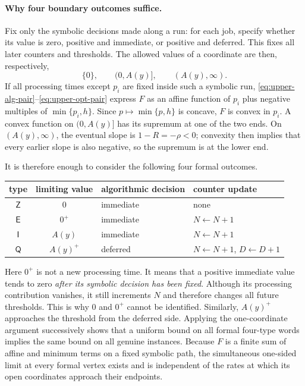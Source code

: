 \paragraph{Why four boundary outcomes suffice.}
Fix only the symbolic decisions made along a run: for each job, specify
whether its value is zero, positive and immediate, or positive and deferred.
This fixes all later counters and thresholds.  The allowed values of a
coordinate are then, respectively,
\[
 \{0\},\qquad (0,A(y)],\qquad (A(y),\infty).
\]
If all processing times except $p_i$ are fixed inside such a symbolic run,
\eqref{eq:upper-alg-pair}--\eqref{eq:upper-opt-pair} express $F$ as an
affine function of $p_i$ plus negative multiples of
$\min\{p_i,h\}$.  Since $p\mapsto\min\{p,h\}$ is concave, $F$ is convex in
$p_i$.  A convex function on $(0,A(y)]$ has its supremum at one of the two
ends.  On $(A(y),\infty)$, the eventual slope is $1-R=-\rho<0$; convexity
then implies that every earlier slope is also negative, so the supremum is at
the lower end.

It is therefore enough to consider the following four formal outcomes.
\begin{center}
\begin{tabular}{ccll}
\toprule
type & limiting value & algorithmic decision & counter update\\
\midrule
$\mathsf Z$ & $0$ & immediate & none\\
$\mathsf E$ & $0^+$ & immediate & $N\leftarrow N+1$\\
$\mathsf I$ & $A(y)$ & immediate & $N\leftarrow N+1$\\
$\mathsf Q$ & $A(y)^+$ & deferred
             & $N\leftarrow N+1$, $D\leftarrow D+1$\\
\bottomrule
\end{tabular}
\end{center}
Here $0^+$ is not a new processing time.  It means that a positive immediate
value tends to zero \emph{after its symbolic decision has been fixed}.
Although its processing contribution vanishes, it still increments $N$ and
therefore changes all future thresholds.  This is why $0$ and $0^+$ cannot be
identified.  Similarly, $A(y)^+$ approaches the threshold from the deferred
side.  Applying the one-coordinate argument successively shows that a uniform
bound on all formal four-type words implies the same bound on all genuine
instances.  Because $F$ is a finite sum of affine and minimum terms on a fixed
symbolic path, the simultaneous one-sided limit at every formal vertex exists
and is independent of the rates at which its open coordinates approach their
endpoints.

